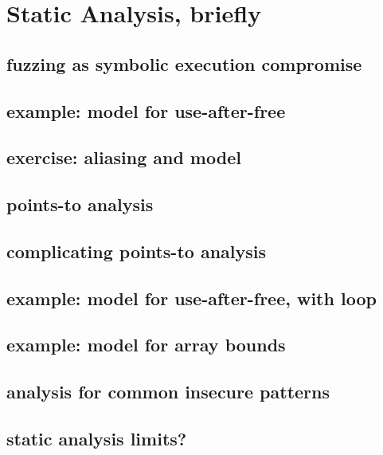 
\section{Static Analysis, briefly}

\subsection{fuzzing as symbolic execution compromise}


\subsection{example: model for use-after-free}


\subsection{exercise: aliasing and model}


\subsection{points-to analysis}

\subsection{complicating points-to analysis}


\subsection{example: model for use-after-free, with loop}


\subsection{example: model for array bounds}


\subsection{analysis for common insecure patterns}


\subsection{static analysis limits?}


